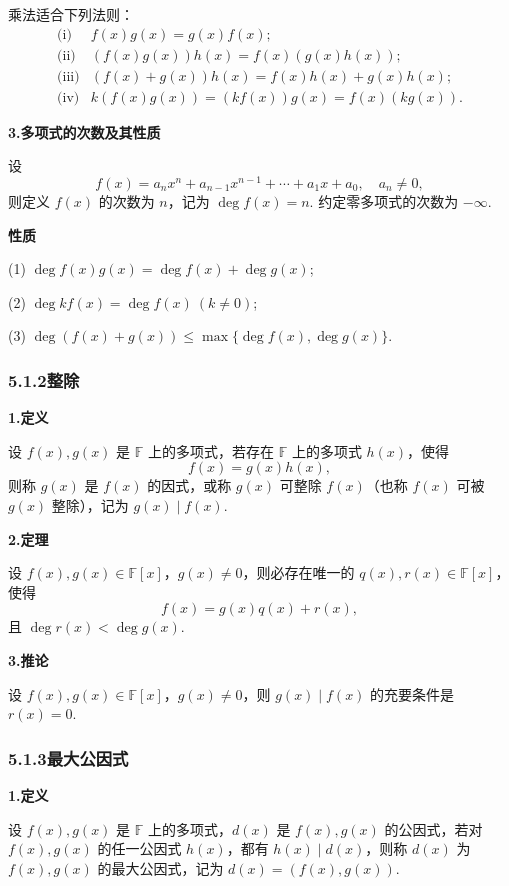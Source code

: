 \documentclass[UTF8,12pt,a4paper,fontset=fandol]{ctexart}
\begin{document}
乘法适合下列法则：
\[
\begin{array}{ll}
\text{(i)} & f(x)g(x)=g(x)f(x);\\
\text{(ii)} & (f(x)g(x))h(x)=f(x)(g(x)h(x));\\
\text{(iii)} & (f(x)+g(x))h(x)=f(x)h(x)+g(x)h(x);\\
\text{(iv)} & k(f(x)g(x))=(kf(x))g(x)=f(x)(kg(x)).
\end{array}
\]

\noindent\textbf{3.\quad 多项式的次数及其性质}

设
\[
f(x)=a_nx^n+a_{n-1}x^{n-1}+\cdots+a_1x+a_0,\quad a_n\ne0,
\]
则定义 $f(x)$ 的次数为 $n$，记为 $\deg f(x)=n$. 约定零多项式的次数为 $-\infty$.

\noindent\textbf{性质}

(1) $\deg f(x)g(x)=\deg f(x)+\deg g(x)$;

(2) $\deg kf(x)=\deg f(x)\ (k\ne0)$;

(3) $\deg(f(x)+g(x))\le\max\{\deg f(x),\deg g(x)\}$.

\subsubsection*{5.1.2\quad 整除}

\noindent\textbf{1.\quad 定义}

设 $f(x),g(x)$ 是 $\mathbb{F}$ 上的多项式，若存在 $\mathbb{F}$ 上的多项式 $h(x)$，使得
\[
f(x)=g(x)h(x),
\]
则称 $g(x)$ 是 $f(x)$ 的因式，或称 $g(x)$ 可整除 $f(x)$（也称 $f(x)$ 可被 $g(x)$ 整除），记为 $g(x)\mid f(x)$.

\noindent\textbf{2.\quad 定理}

设 $f(x),g(x)\in\mathbb{F}[x]$，$g(x)\ne0$，则必存在唯一的 $q(x),r(x)\in\mathbb{F}[x]$，使得
\[
f(x)=g(x)q(x)+r(x),
\]
且 $\deg r(x)<\deg g(x)$.

\noindent\textbf{3.\quad 推论}

设 $f(x),g(x)\in\mathbb{F}[x]$，$g(x)\ne0$，则 $g(x)\mid f(x)$ 的充要条件是 $r(x)=0$.

\subsubsection*{5.1.3\quad 最大公因式}

\noindent\textbf{1.\quad 定义}

设 $f(x),g(x)$ 是 $\mathbb{F}$ 上的多项式，$d(x)$ 是 $f(x),g(x)$ 的公因式，若对 $f(x),g(x)$ 的任一公因式 $h(x)$，都有 $h(x)\mid d(x)$，则称 $d(x)$ 为 $f(x),g(x)$ 的最大公因式，记为 $d(x)=(f(x),g(x))$.
\end{document}
